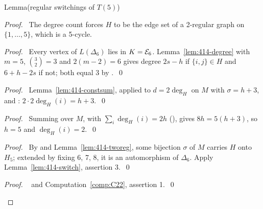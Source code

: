 \begin{namedresult}{Lemma}{(regular switchings of $T(5)$)}\label{lem:414-E6}
\end{namedresult}
\begin{proof}
 \pfsketch\ The degree count forces $H$ to be the edge set of a 2-regular graph on
 $\{1,\dots,5\}$, which is a 5-cycle.
 \begin{proof}\pf\ Every vertex of $L(\Delta_6)$ lies in $K=\mathcal E_6$. Lemma~\ref{lem:414-degree} with
  $m=5$, $\binom32=3$ and $2(m-2)=6$ gives degree $2s-h$ if $\{i,j\}\in H$ and $6+h-2s$ if not;
  both equal 3 by .~\qed\end{proof}
 \begin{proof}\pf\ Lemma~\ref{lem:414-constsum}, applied to $d=2\deg_H$ on $M$ with $\sigma=h+3$,
  and : $2\cdot2\deg_H(i)=h+3$.~\qed\end{proof}
 \begin{proof}\pf\ Summing  over $M$, with $\sum_i\deg_H(i)=2h$
  (), gives $8h=5(h+3)$, so $h=5$ and
  $\deg_H(i)=2$.~\qed\end{proof}
 \begin{proof}\pf\ By  and Lemma~\ref{lem:414-tworeg}, some bijection $\sigma$ of
  $M$ carries $H$ onto $H_5$; extended by fixing 6, 7, 8, it is an automorphism of $\Delta_6$. Apply
  Lemma~\ref{lem:414-switch}, assertion 3.~\qed\end{proof}
 \qedstep
 \begin{proof}\pf\  and Computation~\ref{comp:C22}, assertion
  1.~\qed\end{proof}
\end{proof}

